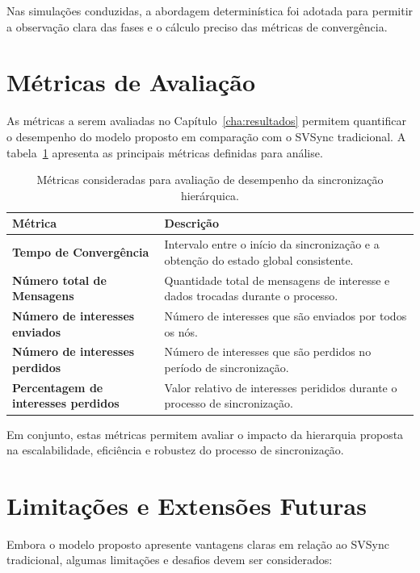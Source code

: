 Nas simulações conduzidas, a abordagem determinística foi adotada para permitir a observação clara das fases e o cálculo preciso das métricas de convergência.

\section{Métricas de Avaliação}

As métricas a serem avaliadas no Capítulo~\ref{cha:resultados} permitem quantificar o desempenho do modelo proposto em comparação com o SVSync tradicional.  
A tabela~\ref{tab:metricas_sync} apresenta as principais métricas definidas para análise.

\begin{table}[H]
\centering
\caption{Métricas consideradas para avaliação de desempenho da sincronização hierárquica.}
\label{tab:metricas_sync}
\begin{tabular}{p{4cm} p{10cm}}
\toprule
\textbf{Métrica} & \textbf{Descrição} \\
\midrule
\textbf{Tempo de Convergência} & Intervalo entre o início da sincronização e a obtenção do estado global consistente. \\
\textbf{Número total de Mensagens} & Quantidade total de mensagens de interesse e dados trocadas durante o processo. \\
\textbf{Número de interesses enviados} & Número de interesses que são enviados por todos os nós. \\
\textbf{Número de interesses perdidos} &  Número de interesses que são perdidos no período de sincronização. \\
\textbf{Percentagem de interesses perdidos} & Valor relativo de interesses perididos durante o processo de sincronização. \\
\bottomrule
\end{tabular}
\end{table}

Em conjunto, estas métricas permitem avaliar o impacto da hierarquia proposta na escalabilidade, eficiência e robustez do processo de sincronização.

\section{Limitações e Extensões Futuras}

Embora o modelo proposto apresente vantagens claras em relação ao \gls{SVSync} tradicional, algumas limitações e desafios devem ser considerados:


